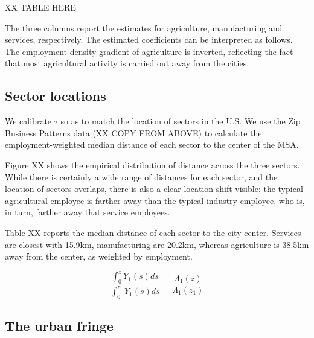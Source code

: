 \documentclass[12pt]{article}
\begin{document}
XX TABLE HERE

The three columns report the estimates for agriculture, manufacturing and services, respectively. The estimated coefficients can be interpreted as follows. The employment density gradient of agriculture is inverted, reflecting the fact that most agricultural activity is carried out away from the cities.

\subsection{Sector locations}
We calibrate $\tau$ so as to match the location of sectors in the U.S. We use the Zip Business Patterns data (XX COPY FROM ABOVE) to calculate the employment-weighted median distance of each sector to the center of the MSA.

Figure XX shows the empirical distribution of distance across the three sectors. While there is certainly a wide range of distances for each sector, and the location of sectors overlaps, there is also a clear location shift visible: the typical agricultural employee is farther away than the typical industry employee, who is, in turn, farther away that service employees.

Table XX reports the median distance of each sector to the city center. Services are closest with 15.9km, manufacturing are 20.2km, whereas agriculture is 38.5km away from the center, as weighted by employment.

\[
\frac{\int_0^z Y_1(s)ds}{\int_0^{z_1} Y_1(s)ds} = \frac{\Lambda_1(z)}{\Lambda_1(z_1)}
\]

\subsection{The urban fringe}
\end{document}
